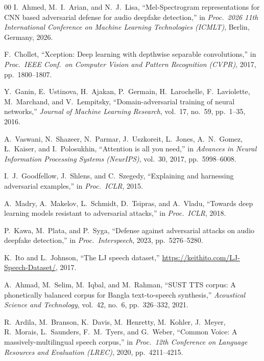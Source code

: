 \documentclass[conference]{IEEEtran}
\begin{document}
\begin{thebibliography}{00}
I.~Ahmed, M.~I.~Arian, and N.~J.~Lisa, ``Mel-Spectrogram representations for
CNN based adversarial defense for audio deepfake detection,''
in \emph{Proc.\ 2026 11th International Conference on Machine Learning
Technologies (ICMLT)}, Berlin, Germany, 2026.

F.~Chollet, ``Xception: Deep learning with depthwise separable convolutions,''
in \emph{Proc.\ IEEE Conf.\ on Computer Vision and Pattern Recognition
(CVPR)}, 2017, pp.~1800--1807.

Y.~Ganin, E.~Ustinova, H.~Ajakan, P.~Germain, H.~Larochelle, F.~Laviolette,
M.~Marchand, and V.~Lempitsky, ``Domain-adversarial training of neural
networks,'' \emph{Journal of Machine Learning Research}, vol.~17, no.~59,
pp.~1--35, 2016.

A.~Vaswani, N.~Shazeer, N.~Parmar, J.~Uszkoreit, L.~Jones, A.~N.~Gomez,
{\L}.~Kaiser, and I.~Polosukhin, ``Attention is all you need,'' in
\emph{Advances in Neural Information Processing Systems (NeurIPS)}, vol.~30,
2017, pp.~5998--6008.

I.~J.~Goodfellow, J.~Shlens, and C.~Szegedy, ``Explaining and harnessing
adversarial examples,'' in \emph{Proc.\ ICLR}, 2015.

A.~Madry, A.~Makelov, L.~Schmidt, D.~Tsipras, and A.~Vladu, ``Towards deep
learning models resistant to adversarial attacks,'' in \emph{Proc.\ ICLR},
2018.

P.~Kawa, M.~Plata, and P.~Syga, ``Defense against adversarial attacks on audio
deepfake detection,'' in \emph{Proc.\ Interspeech}, 2023, pp.~5276--5280.

K.~Ito and L.~Johnson, ``The LJ speech dataset,''
\url{https://keithito.com/LJ-Speech-Dataset/}, 2017.

A.~Ahmad, M.~Selim, M.~Iqbal, and M.~Rahman, ``SUST TTS corpus: A
phonetically balanced corpus for Bangla text-to-speech synthesis,''
\emph{Acoustical Science and Technology}, vol.~42, no.~6, pp.~326--332, 2021.

R.~Ardila, M.~Branson, K.~Davis, M.~Henretty, M.~Kohler, J.~Meyer, R.~Morais,
L.~Saunders, F.~M.~Tyers, and G.~Weber, ``Common Voice: A
massively-multilingual speech corpus,'' in \emph{Proc.\ 12th Conference on
Language Resources and Evaluation (LREC)}, 2020, pp.~4211--4215.

\end{thebibliography}
\end{document}
